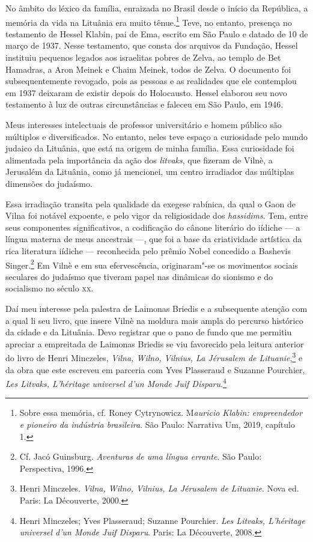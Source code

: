 No âmbito do léxico da família, enraizada no Brasil desde o início da
República, a memória da vida na Lituânia era muito tênue.\footnote{Sobre
  essa memória, cf. Roney Cytrynowicz. M\textit{auricio Klabin:
  empreendedor e pioneiro da indústria brasileira}. São Paulo: Narrativa
  Um, 2019, capítulo 1.} Teve, no entanto, presença no testamento de
Hessel Klabin, pai de Ema, escrito em São Paulo e datado de 10 de março
de 1937. Nesse testamento, que consta dos arquivos da Fundação, Hessel
instituiu pequenos legados aos israelitas pobres de Zelva, ao templo de
Bet Hamadras, a Aron Meinek e Chaim Meinek, todos de Zelva. O documento
foi subsequentemente revogado, pois as pessoas e as realidades que ele
contemplou em 1937 deixaram de existir depois do Holocausto. Hessel
elaborou seu novo testamento à luz de outras circunstâncias e faleceu em
São Paulo, em 1946.

Meus interesses intelectuais de professor universitário e homem público
são múltiplos e diversificados. No entanto, neles teve espaço a
curiosidade pelo mundo judaico da Lituânia, que está na origem de minha
família. Essa curiosidade foi alimentada pela importância da ação dos
\textit{litvaks}, que fizeram de Vilnè, a Jerusalém da Lituânia, como já
mencionei, um centro irradiador das múltiplas dimensões do judaísmo.

Essa irradiação transita pela qualidade da exegese rabínica, da qual o
Gaon de Vilna foi notável expoente, e pelo vigor da religiosidade dos
\textit{hassidims}. Tem, entre seus componentes significativos, a
codificação do cânone literário do iídiche --- a língua materna de meus
ancestrais ---, que foi a base da criatividade artística da rica
literatura iídiche --- reconhecida pelo prêmio Nobel concedido a Bashevis
Singer.\footnote{Cf. Jacó Guinsburg. \textit{Aventuras de uma língua
  errante}. São Paulo: Perspectiva, 1996.} Em Vilnè e em sua
efervescência, originaram"-se os movimentos sociais seculares do judaísmo
que tiveram papel nas dinâmicas do sionismo e do socialismo no século
\textsc{xx}.

Daí meu interesse pela palestra de Laimonas Briedis e a subsequente
atenção com a qual li seu livro, que insere Vilnè na moldura mais ampla
do percurso histórico da cidade e da Lituânia. Devo registrar que o pano
de fundo que me permitiu apreciar a empreitada de Laimonas Briedis se
viu favorecido pela leitura anterior do livro de Henri Minczeles,
\textit{Vilna, Wilno, Vilnius, La Jérusalem de Lituanie},\footnote{Henri
  Minczeles. \textit{Vilna, Wilno, Vilnius, La Jérusalem de Lituanie}.
  Nova ed. Paris: La Découverte, 2000.} e da obra que este escreveu em
parceria com Yves Plasseraud e Suzanne Pourchier, \textit{Les Litvaks,
L'héritage universel d'un Monde Juif Disparu}.\footnote{Henri Minczeles;
  Yves Plasseraud; Suzanne Pourchier. \textit{Les Litvaks, L'héritage
  universel d'un Monde Juif Disparu}. Paris: La Découverte, 2008.}

